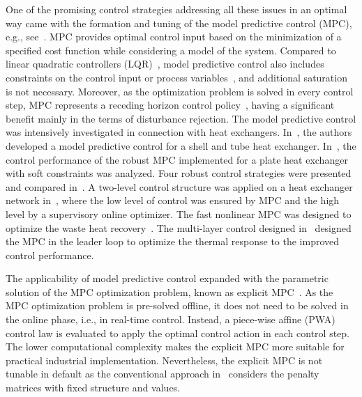 \documentclass[preprint,12pt]{elsarticle}
\begin{document}
	One of the promising control strategies addressing all these issues in an optimal way came with the formation and tuning of the model predictive control (MPC), e.g., see~\cite{Morari_MPC}. MPC provides optimal control input based on the minimization of a specified cost function while considering a model of the system. Compared to linear quadratic controllers (LQR)~\cite{LQR}, model predictive control also includes constraints on the control input or process variables~\cite{Maciejowski_MPC}, and additional saturation is not necessary. Moreover, as the optimization problem is solved in every control step, MPC represents a receding horizon control policy~\cite{receding_horizon}, having a significant benefit mainly in the terms of disturbance rejection. The model predictive control was intensively investigated in connection with heat exchangers. In~\cite{Vinaya_HE_MPC}, the authors developed a model predictive control for a shell and tube heat exchanger. In~\cite{Oravec_energy}, the control performance of the robust MPC implemented for a plate heat exchanger with soft constraints was analyzed. Four robust control strategies were presented and compared in~\cite{Oravec_HE_ATE}. A two-level control structure was applied on a heat exchanger network in~\cite{Gonzales_HE_MPC}, where the low level of control was ensured by MPC and the high level by a supervisory online optimizer. The fast nonlinear MPC was designed to optimize the waste heat recovery~\cite{WC19}.  The multi-layer control designed in~\cite{DZ18} designed the MPC in the leader loop to optimize the thermal response to the improved control performance.      
	
	The applicability of model predictive control expanded with the parametric solution of the MPC optimization problem, known as explicit MPC~\cite{Bemporad_automatica}. As the MPC optimization problem is pre-solved offline, it does not need to be solved in the online phase, i.e., in real-time control. Instead, a piece-wise affine (PWA) control law is evaluated to apply the optimal control action in each control step. The lower computational complexity makes the explicit MPC more suitable for practical industrial implementation. Nevertheless, the explicit MPC is not tunable in default as the conventional approach in~\cite{Bemporad_automatica} considers the penalty matrices with fixed structure and values.
	
\end{document}
